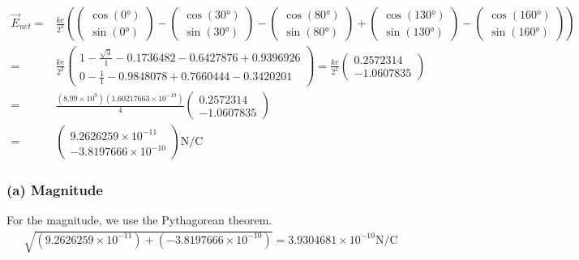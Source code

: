 \documentclass[12pt]{article}
\begin{document}
\begin{align*}
    \vec{E}_{net}   =&  \frac{ke}{2^3}\left(\begin{pmatrix}\cos(0\unit{\degree})\\ \sin(0\unit{\degree})\end{pmatrix}
        - \begin{pmatrix}\cos(30\unit{\degree})\\ \sin(30\unit{\degree})\end{pmatrix}
        - \begin{pmatrix}\cos(80\unit{\degree})\\ \sin(80\unit{\degree})\end{pmatrix}
        + \begin{pmatrix}\cos(130\unit{\degree})\\ \sin(130\unit{\degree})\end{pmatrix}
        - \begin{pmatrix}\cos(160\unit{\degree})\\ \sin(160\unit{\degree})\end{pmatrix}\right)\\
        =&  \frac{ke}{2^2} \begin{pmatrix}
            1   - \frac{\sqrt{3}}{1}    - 0.1736482 - 0.6427876    + 0.9396926\\
            0   - \frac{1}{1}           - 0.9848078 + 0.7660444    - 0.3420201
        \end{pmatrix}
        =   \frac{ke}{2^2} \begin{pmatrix}
            0.2572314\\
            -1.0607835
        \end{pmatrix}\\
        =&  \frac{(8.99 \times 10^{9})(1.60217663 \times 10^{-19})}{4}\begin{pmatrix} 0.2572314 \\ -1.0607835\end{pmatrix}\\
        =&  \begin{pmatrix} 9.2626259 \times 10^{-11} \\ -3.8197666 \times 10^{-10} \end{pmatrix} \unit{\newton/\coulomb}
\end{align*}

\subsubsection*{(a) Magnitude}
For the magnitude, we use the Pythagorean theorem.
\begin{align*}
    \sqrt{(9.2626259 \times 10^{-11}) + (-3.8197666 \times 10^{-10})} = \boxed{3.9304681 \times 10^{-10} \unit{\newton/\coulomb}}
\end{align*}
\end{document}
